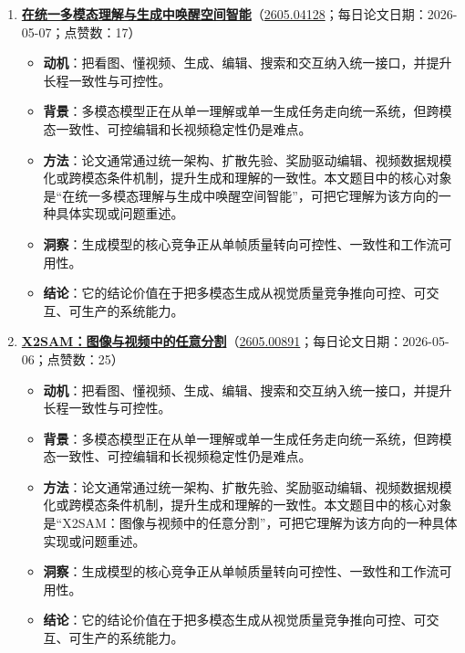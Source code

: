 \begin{enumerate}[leftmargin=1.5em]
\begin{itemize}[leftmargin=1.5em]
    \item \textbf{洞察}：真正有用的世界模型必须同时回答状态会如何变化、动作是否可行以及失败风险在哪里。
    \item \textbf{结论}：它的结论价值在于把多模态生成从视觉质量竞争推向可控、可交互、可生产的系统能力。
  \end{itemize}
  \item \textbf{\href{https://huggingface.co/papers/2605.04128}{在统一多模态理解与生成中唤醒空间智能}}（\href{https://arxiv.org/abs/2605.04128}{2605.04128}；每日论文日期：2026-05-07；点赞数：17）
  \begin{itemize}[leftmargin=1.5em]
    \item \textbf{动机}：把看图、懂视频、生成、编辑、搜索和交互纳入统一接口，并提升长程一致性与可控性。
    \item \textbf{背景}：多模态模型正在从单一理解或单一生成任务走向统一系统，但跨模态一致性、可控编辑和长视频稳定性仍是难点。
    \item \textbf{方法}：论文通常通过统一架构、扩散先验、奖励驱动编辑、视频数据规模化或跨模态条件机制，提升生成和理解的一致性。本文题目中的核心对象是“在统一多模态理解与生成中唤醒空间智能”，可把它理解为该方向的一种具体实现或问题重述。
    \item \textbf{洞察}：生成模型的核心竞争正从单帧质量转向可控性、一致性和工作流可用性。
    \item \textbf{结论}：它的结论价值在于把多模态生成从视觉质量竞争推向可控、可交互、可生产的系统能力。
  \end{itemize}
  \item \textbf{\href{https://huggingface.co/papers/2605.00891}{X2SAM：图像与视频中的任意分割}}（\href{https://arxiv.org/abs/2605.00891}{2605.00891}；每日论文日期：2026-05-06；点赞数：25）
  \begin{itemize}[leftmargin=1.5em]
    \item \textbf{动机}：把看图、懂视频、生成、编辑、搜索和交互纳入统一接口，并提升长程一致性与可控性。
    \item \textbf{背景}：多模态模型正在从单一理解或单一生成任务走向统一系统，但跨模态一致性、可控编辑和长视频稳定性仍是难点。
    \item \textbf{方法}：论文通常通过统一架构、扩散先验、奖励驱动编辑、视频数据规模化或跨模态条件机制，提升生成和理解的一致性。本文题目中的核心对象是“X2SAM：图像与视频中的任意分割”，可把它理解为该方向的一种具体实现或问题重述。
    \item \textbf{洞察}：生成模型的核心竞争正从单帧质量转向可控性、一致性和工作流可用性。
    \item \textbf{结论}：它的结论价值在于把多模态生成从视觉质量竞争推向可控、可交互、可生产的系统能力。

\end{itemize}
\end{enumerate}
